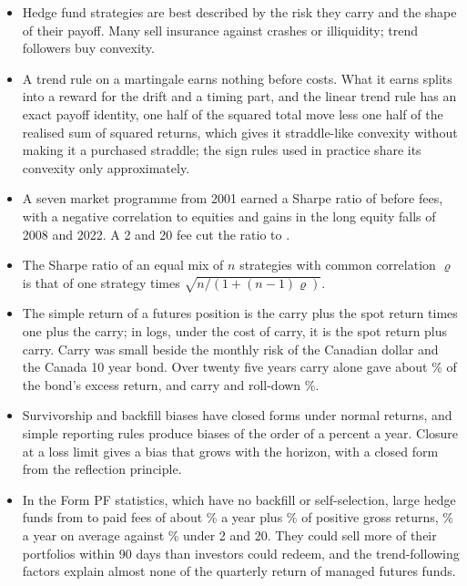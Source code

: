 \begin{chapterrefs}
\begin{itemize}
  \item Hedge fund strategies are best described by the risk they carry and the shape of their payoff.
        Many sell insurance against crashes or illiquidity; trend followers buy convexity.
  \item A trend rule on a martingale earns nothing before costs. What it earns splits into a reward
        for the drift and a timing part, and the linear trend rule has an exact payoff identity, one half of
        the squared total move less one half of the realised sum of squared returns, which gives it
        straddle-like convexity without making it a purchased straddle; the sign rules used in practice share its convexity only
        approximately.
  \item A seven market programme from 2001 earned a Sharpe ratio of \tfSR{} before fees, with a
        negative correlation to equities and gains in the long equity falls of 2008 and 2022. A 2 and
        20 fee cut the ratio to \tfSRnet.
  \item The Sharpe ratio of an equal mix of $n$ strategies with common correlation $\varrho$ is that
        of one strategy times $\sqrt{n/(1+(n-1)\varrho)}$.
  \item The simple return of a futures position is the carry plus the spot return times one plus the
        carry; in logs, under the cost of carry, it is the spot return plus carry. Carry was small beside
        the monthly risk of the Canadian dollar and the Canada 10 year bond. Over twenty five years carry
        alone gave about \gcCarryShare\% of the bond's excess return, and carry and roll-down \gcExpShare\%.
  \item Survivorship and backfill biases have closed forms under normal returns, and simple reporting
        rules produce biases of the order of a percent a year. Closure at a loss limit gives a bias
        that grows with the horizon, with a closed form from the reflection principle.
  \item In the Form PF statistics, which have no backfill or self-selection, large hedge funds from
        \hdFirst{} to \hdLast{} paid fees of about \hdFeeMgmt\% a year plus \hdFeeInc\% of positive gross
        returns, \hdActualDrag\% a year on average against \hdTwoTwentyDrag\% under 2 and 20. They could
        sell more of their portfolios within 90 days than investors could redeem, and the trend-following
        factors explain almost none of the quarterly return of managed futures funds.

\end{itemize}
\end{chapterrefs}
